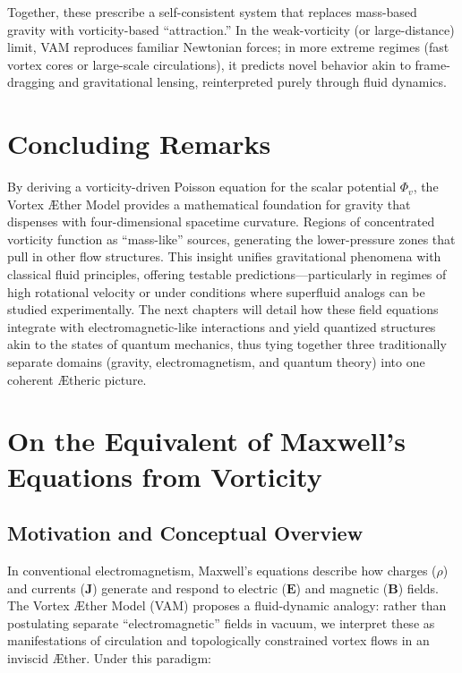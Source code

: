 \documentclass[aps,preprint,superscriptaddress]{revtex4-2}
\begin{document}
    Together, these prescribe a self-consistent system that replaces mass-based gravity with vorticity-based “attraction.” In the weak-vorticity (or large-distance) limit, VAM reproduces familiar Newtonian forces; in more extreme regimes (fast vortex cores or large-scale circulations), it predicts novel behavior akin to frame-dragging and gravitational lensing, reinterpreted purely through fluid dynamics.

    \section{Concluding Remarks}

    By deriving a vorticity-driven Poisson equation for the scalar potential \(\Phi_v\), the Vortex Æther Model provides a mathematical foundation for gravity that dispenses with four-dimensional spacetime curvature. Regions of concentrated vorticity function as “mass-like” sources, generating the lower-pressure zones that pull in other flow structures. This insight unifies gravitational phenomena with classical fluid principles, offering testable predictions—particularly in regimes of high rotational velocity or under conditions where superfluid analogs can be studied experimentally. The next chapters will detail how these field equations integrate with electromagnetic-like interactions and yield quantized structures akin to the states of quantum mechanics, thus tying together three traditionally separate domains (gravity, electromagnetism, and quantum theory) into one coherent Ætheric picture.


    \section{On the Equivalent of Maxwell’s Equations from Vorticity}

    \subsection{Motivation and Conceptual Overview}

    In conventional electromagnetism, Maxwell’s equations describe how charges (\( \rho \)) and currents (\(\mathbf{J}\)) generate and respond to electric (\(\mathbf{E}\)) and magnetic (\(\mathbf{B}\)) fields. The Vortex Æther Model (VAM) proposes a fluid-dynamic analogy: rather than postulating separate “electromagnetic” fields in vacuum, we interpret these as manifestations of circulation and topologically constrained vortex flows in an inviscid Æther. Under this paradigm:
\end{document}
